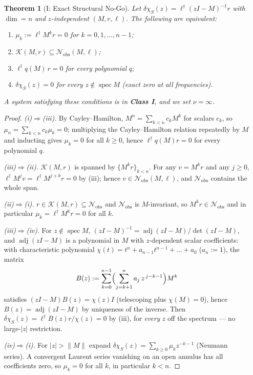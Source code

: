 \documentclass[11pt]{article}
\newtheorem{theorem}{Theorem}
\newcommand{\adj}{\operatorname{adj}}
\newcommand{\kry}{\mathcal K}
\newcommand{\nobs}{\mathcal N_{\mathrm{obs}}}
\begin{document}
\begin{theorem}[I: Exact Structural No-Go]
\label{thm:I}
Let $\delta\chi_S(z)=\ell^\dagger(zI-M)^{-1}r$ with $\dim=n$ and
$z$-independent $(M,r,\ell)$. The following are equivalent:
\begin{enumerate}[label=(\roman*),nosep]
\item $\mu_k:=\ell^\dagger M^k r=0$ for $k=0,1,\dots,n-1$;
\item $\kry(M,r)\subseteq\nobs(M,\ell)$;
\item $\ell^\dagger q(M)\,r=0$ for every polynomial $q$;
\item $\delta\chi_S(z)=0$ for every $z\notin\operatorname{spec}M$
      (exact zero at all frequencies).
\end{enumerate}
A system satisfying these conditions is in \textbf{Class I}, and we set
$\nu=\infty$.
\end{theorem}

\begin{proof}
\emph{(i)$\Rightarrow$(iii).} By Cayley--Hamilton, $M^n=\sum_{k<n}c_kM^k$ for
scalars $c_k$, so $\mu_n=\sum_{k<n}c_k\mu_k=0$; multiplying the
Cayley--Hamilton relation repeatedly by $M$ and inducting gives $\mu_k=0$ for
all $k\ge0$, hence $\ell^\dagger q(M)r=0$ for every polynomial $q$.

\emph{(iii)$\Rightarrow$(ii).} $\kry(M,r)$ is spanned by
$\{M^kr\}_{k<n}$. For any $v=M^kr$ and any $j\ge0$,
$\ell^\dagger M^jv=\ell^\dagger M^{j+k}r=0$ by (iii); hence
$v\in\nobs(M,\ell)$, and $\nobs$ contains the whole span.

\emph{(ii)$\Rightarrow$(i).} $r\in\kry(M,r)\subseteq\nobs$ and $\nobs$ is
$M$-invariant, so $M^kr\in\nobs$ and in particular
$\mu_k=\ell^\dagger M^kr=0$ for all $k$.

\emph{(iii)$\Rightarrow$(iv).} For $z\notin\operatorname{spec}M$,
$(zI-M)^{-1}=\adj(zI-M)/\det(zI-M)$, and $\adj(zI-M)$ is a polynomial in $M$
with $z$-dependent scalar coefficients: with characteristic polynomial
$\chi(t)=t^n+a_{n-1}t^{n-1}+\dots+a_0$ ($a_n:=1$), the matrix
\[
B(z):=\sum_{k=0}^{n-1}\Bigl(\sum_{j=k+1}^{n}a_j\,z^{\,j-k-1}\Bigr)M^{k}
\]
satisfies $(zI-M)B(z)=\chi(z)I$ (telescoping plus $\chi(M)=0$), hence
$B(z)=\adj(zI-M)$ by uniqueness of the inverse. Then
$\delta\chi_S(z)=\ell^\dagger B(z)r/\chi(z)=0$ by (iii), for \emph{every} $z$
off the spectrum --- no large-$|z|$ restriction.

\emph{(iv)$\Rightarrow$(i).} For $|z|>\|M\|$ expand
$\delta\chi_S(z)=\sum_{k\ge0}\mu_k z^{-k-1}$ (Neumann series). A convergent
Laurent series vanishing on an open annulus has all coefficients zero, so
$\mu_k=0$ for all $k$, in particular $k<n$.
\end{proof}
\end{document}
